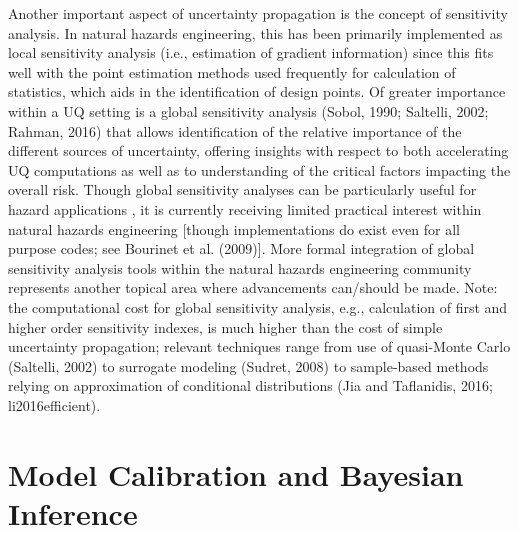 Another important aspect of uncertainty propagation is the concept of sensitivity analysis. In natural hazards engineering, this has been primarily implemented as local sensitivity analysis (i.e., estimation of gradient information) since this fits well with the point estimation methods used frequently for calculation of statistics, which aids in the identification of design points. Of greater importance within a UQ setting is a global sensitivity analysis (Sobol, 1990; Saltelli, 2002; Rahman, 2016) that allows identification of the relative importance of the different sources of uncertainty, offering insights with respect to both accelerating UQ computations as well as to understanding of the critical factors impacting the overall risk. Though global sensitivity analyses can be particularly useful for hazard applications \citep{vetter2012global}, it is currently receiving limited practical interest within natural hazards engineering [though implementations do exist even for all purpose codes; see Bourinet et al. (2009)]. More formal integration of global sensitivity analysis tools within the natural hazards engineering community represents another topical area where advancements can/should be made. Note: the computational cost for global sensitivity analysis, e.g., calculation of first and higher order sensitivity indexes, is much higher than the cost of simple uncertainty propagation; relevant techniques range from use of quasi-Monte Carlo (Saltelli, 2002) to surrogate modeling (Sudret, 2008) to sample-based methods relying on approximation of conditional distributions (Jia and Taflanidis, 2016; li2016efficient).

\section{Model Calibration and Bayesian Inference}
\label{sec:uq_calibration}

